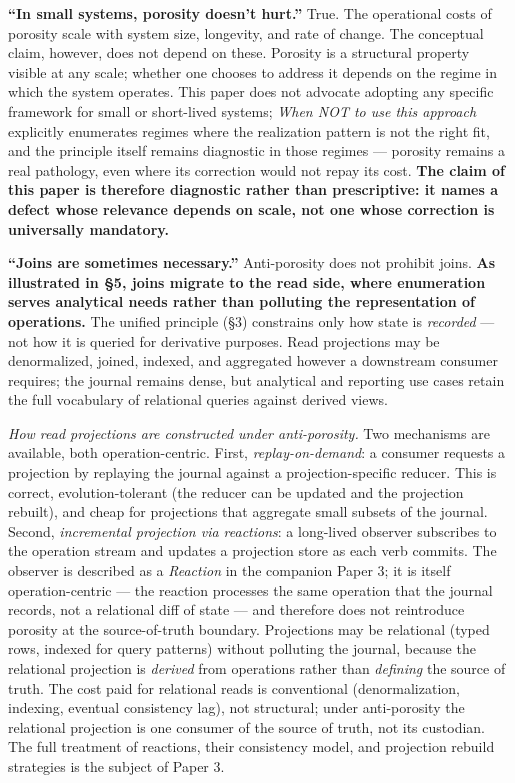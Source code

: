 \documentclass[
]{article}
\begin{document}
\textbf{``In small systems, porosity doesn't hurt.''} True. The
operational costs of porosity scale with system size, longevity, and
rate of change. The conceptual claim, however, does not depend on these.
Porosity is a structural property visible at any scale; whether one
chooses to address it depends on the regime in which the system
operates. This paper does not advocate adopting any specific framework
for small or short-lived systems; \emph{When NOT to use this approach}
explicitly enumerates regimes where the realization pattern is not the
right fit, and the principle itself remains diagnostic in those regimes
--- porosity remains a real pathology, even where its correction would
not repay its cost. \textbf{The claim of this paper is therefore
diagnostic rather than prescriptive: it names a defect whose relevance
depends on scale, not one whose correction is universally mandatory.}

\textbf{``Joins are sometimes necessary.''} Anti-porosity does not
prohibit joins. \textbf{As illustrated in §5, joins migrate to the read
side, where enumeration serves analytical needs rather than polluting
the representation of operations.} The unified principle (§3) constrains
only how state is \emph{recorded} --- not how it is queried for
derivative purposes. Read projections may be denormalized, joined,
indexed, and aggregated however a downstream consumer requires; the
journal remains dense, but analytical and reporting use cases retain the
full vocabulary of relational queries against derived views.

\emph{How read projections are constructed under anti-porosity.} Two
mechanisms are available, both operation-centric. First,
\emph{replay-on-demand}: a consumer requests a projection by replaying
the journal against a projection-specific reducer. This is correct,
evolution-tolerant (the reducer can be updated and the projection
rebuilt), and cheap for projections that aggregate small subsets of the
journal. Second, \emph{incremental projection via reactions}: a
long-lived observer subscribes to the operation stream and updates a
projection store as each verb commits. The observer is described as a
\emph{Reaction} in the companion Paper 3; it is itself operation-centric
--- the reaction processes the same operation that the journal records,
not a relational diff of state --- and therefore does not reintroduce
porosity at the source-of-truth boundary. Projections may be relational
(typed rows, indexed for query patterns) without polluting the journal,
because the relational projection is \emph{derived} from operations
rather than \emph{defining} the source of truth. The cost paid for
relational reads is conventional (denormalization, indexing, eventual
consistency lag), not structural; under anti-porosity the relational
projection is one consumer of the source of truth, not its custodian.
The full treatment of reactions, their consistency model, and projection
rebuild strategies is the subject of Paper 3.
\end{document}
